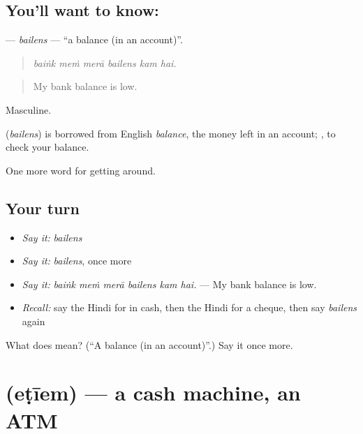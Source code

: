 \subsection*{You'll want to know: }
\textbf{} — \emph{bailens} — \textquotedblleft{}a balance (in an account)\textquotedblright{}.

\begin{quote}
     
\end{quote}

\begin{quote}
\emph{baiṅk meṁ merā bailens kam hai.}
\end{quote}

\begin{quote}
My bank balance is low.
\end{quote}

Masculine.

\begin{cousinweb}
\textbf{} (\emph{bailens}) is borrowed from English \emph{balance}, the money left in an account;  , to check your balance.
\end{cousinweb}

\begin{grammarlens}[title={What you've built}]
One more word for getting around.
\end{grammarlens}

\subsection*{Your turn}
\begin{itemize}
\raggedright
  \item \emph{Say it:} \emph{bailens}
  \item \emph{Say it:} \emph{bailens}, once more
  \item \emph{Say it:} \emph{baiṅk meṁ merā bailens kam hai.} — My bank balance is low.
  \item \emph{Recall:} say the Hindi for in cash, then the Hindi for a cheque, then say \emph{bailens} again
\end{itemize}

\begin{tcolorbox}[breakable,colback=teal!4,colframe=teal!35!black,title={Before you move on}]
What does  mean? (\textquotedblleft{}A balance (in an account)\textquotedblright{}.) Say it once more.
\end{tcolorbox}
\section[\texorpdfstring{\hi{एटीएम} (eṭīem)}{एटीएम (eṭīem)}]{ (eṭīem) — a cash machine, an ATM}

